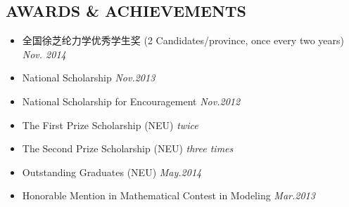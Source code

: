 \documentclass[11pt,a4paper,palatine]{moderncv}        %
\begin{document}
\begin{CJK*}{UTF8}{gbsn}
\section{AWARDS \& ACHIEVEMENTS}
\begin{minipage}{\maincolumnwidth}%
    	\begin{itemize}
          \item 全国徐芝纶力学优秀学生奖 (2 Candidates/province, once every two years) \hfill {\itshape Nov. 2014}
          \item National Scholarship \hfill {\itshape Nov.2013}
          \item National Scholarship for Encouragement \hfill {\itshape Nov.2012}
          \item The First Prize Scholarship (NEU) \hfill {\itshape twice}
          \item The Second Prize Scholarship (NEU) \hfill {\itshape three times}
          \item Outstanding Graduates (NEU) \hfill {\itshape May.2014}
          \item Honorable Mention in Mathematical Contest in Modeling \hfill {\itshape Mar.2013}
		\end{itemize}%
\end{minipage}%

      

\nocite{*}



\end{CJK*}
\end{document}
